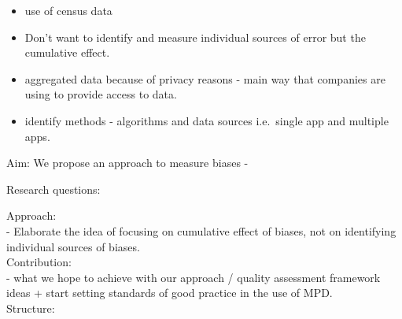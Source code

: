 \documentclass[]{rsos}%
\providecommand{\tightlist}{%
  \setlength{\itemsep}{0pt}\setlength{\parskip}{0pt}}
\begin{document}
\begin{itemize}
\tightlist
\item
  use of census data
\item
  Don't want to identify and measure individual sources of error but the cumulative effect.\\
\item
  aggregated data because of privacy reasons - main way that companies are using to provide access to data.\\
\item
  identify methods - algorithms and data sources i.e.~single app and multiple apps.\\
\end{itemize}

Aim: We propose an approach to measure biases -

Research questions:

Approach:\\
- Elaborate the idea of focusing on cumulative effect of biases, not on identifying individual sources of biases.\\

Contribution:\\
- what we hope to achieve with our approach / quality assessment framework ideas + start setting standards of good practice in the use of MPD.\\

Structure:
\end{document}
